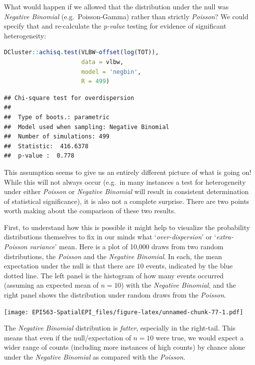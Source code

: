 \documentclass[
]{book}
\begin{document}
What would happen if we allowed that the distribution under the null was \emph{Negative Binomial} (e.g.~Poisson-Gamma) rather than strictly \emph{Poisson}? We could specify that and re-calculate the \emph{p-value} testing for evidence of significant heterogeneity:

\begin{lstlisting}[language=R]
DCluster::achisq.test(VLBW~offset(log(TOT)), 
                      data = vlbw, 
                      model = 'negbin',
                      R = 499)
\end{lstlisting}

\begin{lstlisting}
## Chi-square test for overdispersion 
## 
## 	Type of boots.: parametric 
## 	Model used when sampling: Negative Binomial 
## 	Number of simulations: 499 
## 	Statistic:  416.6378 
## 	p-value :  0.778
\end{lstlisting}

This assumption seems to give us an entirely different picture of what is going on! While this will not always occur (e.g.~in many instances a test for heterogeneity under either \emph{Poisson} or \emph{Negative Binomial} will result in consistent determination of statistical significance), it is also not a complete surprise. There are two points worth making about the comparison of these two results.

First, to understand how this is possible it might help to visualize the probability distributions themselves to fix in our minds what `\emph{over-dispersion}' or `\emph{extra-Poisson variance}' mean. Here is a plot of 10,000 draws from two random distributions, the \emph{Poisson} and the \emph{Negative Binomial}. In each, the mean expectation under the null is that there are \(10\) events, indicated by the blue dotted line. The left panel is the histogram of how many events occurred (assuming an expected mean of \(n=10\)) with the \emph{Negative Binomial}, and the right panel shows the distribution under random draws from the \emph{Poisson}.

\texttt{[image: EPI563-SpatialEPI\_files/figure-latex/unnamed-chunk-77-1.pdf]}

The \emph{Negative Binomial} distribution is \emph{fatter}, especially in the right-tail. This means that even if the null/expectation of \(n=10\) were true, we would expect a wider range of counts (including more instances of high counts) by chance alone under the \emph{Negative Binomial} as compared with the \emph{Poisson}.
\end{document}
